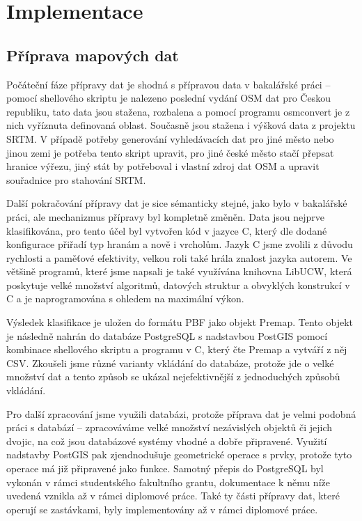 \chapter{Implementace}
\label{ch:implementace}
\section{Příprava mapových dat}
\label{ch:implementace:OSM}
Počáteční fáze přípravy dat je shodná s přípravou data v bakalářské práci --
pomocí shellového skriptu je nalezeno poslední vydání OSM dat pro Českou
republiku, tato data jsou stažena, rozbalena a pomocí programu osmconvert je z
nich vyříznuta definovaná oblast. Současně jsou stažena i výšková data z
projektu SRTM. V případě potřeby generování vyhledávacích dat pro jiné město
nebo jinou zemi je potřeba tento skript upravit, pro jiné české město stačí
přepsat hranice výřezu, jiný stát by potřeboval i vlastní zdroj dat OSM a
upravit souřadnice pro stahování SRTM. 

Další pokračování přípravy
dat je sice sémanticky stejné, jako bylo v bakalářské práci, ale mechanizmus
přípravy byl kompletně změněn. Data jsou nejprve klasifikována, pro tento účel
byl vytvořen kód v jazyce C, který dle dodané konfigurace přiřadí typ hranám a
nově i vrcholům. Jazyk C jsme zvolili z důvodu rychlosti a paměťové efektivity,
velkou roli také hrála znalost jazyka autorem. Ve většině programů, které jsme
napsali je také využívána knihovna LibUCW\cite{LibUCW}, která poskytuje velké
množství algoritmů, datových struktur a obvyklých konstrukcí v C a je
naprogramována s ohledem na maximální výkon.

Výsledek klasifikace je uložen do formátu PBF jako objekt Premap. Tento objekt
je následně nahrán do databáze PostgreSQL s nadstavbou PostGIS pomocí kombinace
shellového skriptu a programu v C, který čte Premap a vytváří z něj CSV.
Zkoušeli jsme různé varianty vkládání do databáze, protože jde o velké množství
dat a tento způsob se ukázal nejefektivnější z jednoduchých způsobů vkládání. 

Pro další zpracování jsme využili databázi, protože příprava dat je velmi
podobná práci s databází -- zpracováváme velké množství nezávislých objektů či
jejich dvojic, na což jsou databázové systémy vhodné a dobře připravené. Využití
nadstavby PostGIS pak zjendnodušuje geometrické operace s prvky, protože tyto
operace má již připravené jako funkce. Samotný přepis do PostgreSQL byl vykonán
v rámci studentského fakultního grantu, dokumentace k němu níže uvedená vznikla
až v rámci diplomové práce. Také ty části přípravy dat, které operují se
zastávkami, byly implementovány až v rámci diplomové práce.

